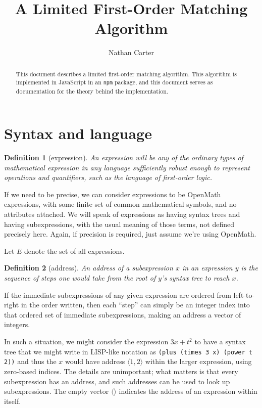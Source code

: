 \documentclass{article}
\newtheorem{dfn}{Definition}
\begin{document}
\title{A Limited First-Order Matching Algorithm}
\author{Nathan Carter}
\maketitle

\begin{abstract}%
This document describes a limited first-order matching algorithm.  This algorithm is implemented in JavaScript in an \texttt{npm} package, and this document serves as documentation for the theory behind the implementation.
\end{abstract}


\section{Syntax and language}%

\begin{dfn}[expression]
An \emph{expression} will be any of the ordinary types of mathematical expression in any language sufficiently robust enough to represent operations and quantifiers, such as the language of first-order logic.
\end{dfn}

If we need to be precise, we can consider expressions to be OpenMath\cite{openmath} expressions, with some finite set of common mathematical symbols, and no attributes attached.  We will speak of expressions as having syntax trees and having subexpressions, with the usual meaning of those terms, not defined precisely here.  Again, if precision is required, just assume we're using OpenMath.

Let $E$ denote the set of all expressions.

\begin{dfn}[address]\label{D:address}
An \emph{address} of a subexpression $x$ in an expression $y$ is the sequence of steps one would take from the root of $y$'s syntax tree to reach $x$.
\end{dfn}

If the immediate subexpressions of any given expression are ordered from left-to-right in the order written, then each ``step'' can simply be an integer index into that ordered set of immediate subexpressions, making an address a vector of integers.

In such a situation, we might consider the expression $3x+t^2$ to have a syntax tree that we might write in LISP-like notation as \verb'(plus (times 3 x) (power t 2))' and thus the $x$ would have address $\langle1,2\rangle$ within the larger expression, using zero-based indices.  The details are unimportant; what matters is that every subexpression has an address, and such addresses can be used to look up subexpressions.  The empty vector $\langle\rangle$ indicates the address of an expression within itself.
\end{document}
